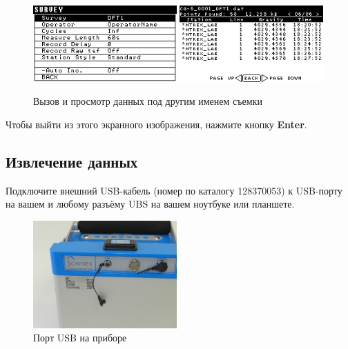 \begin{figure}[h]
  \centering
  \includegraphics[width=0.49\textwidth]{figures/recalling_data_under_a_different_survey_name_1}
  \includegraphics[width=0.49\textwidth]{figures/recalling_data_under_a_different_survey_name_2}
  \caption{Вызов и просмотр данных под другим именем съемки}
  \label{fig:recalling_data_under_a_different_survey_name}
\end{figure}

Чтобы выйти из этого экранного изображения, нажмите кнопку \textbf{Enter}.


\subsection{Извлечение данных}
\label{subsec:taking_a_measurement}

Подключите внешний USB-кабель (номер по каталогу 128370053) к USB-порту на вашем
\cg{} и любому разъёму UBS на вашем ноутбуке или планшете.

\begin{figure}[h]
  \centering
  \includegraphics[width=0.49\textwidth]{figures/the_cg6_autograv_usb_port}
  \caption{Порт USB на приборе \cg{}}
  \label{fig:the_cg6_autograv_usb_port}
\end{figure}

